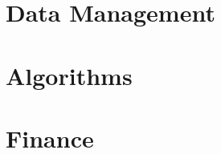 \documentclass[a4paper,11pt,twoside]{book}
\begin{document}
\frontmatter





\tableofcontents


\mainmatter




\part{Data Management}






\part{Algorithms}






\part{Finance}










\end{document}
